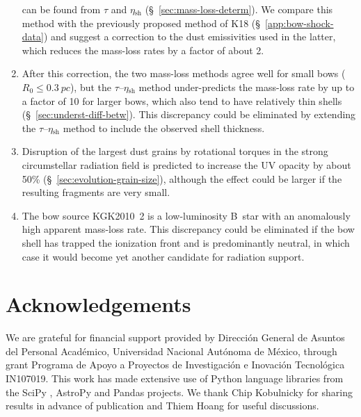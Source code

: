 \documentclass[useAMS, usenatbib, a4paper]{mnras}
\newcommand\shell{\ensuremath{_{\text{sh}}}}
\begin{document}
\begin{enumerate}[1.]
  can be found from \(\tau\) and \(\eta\shell\)
  (\S~\ref{sec:mass-loss-determ}). We compare this method with the
  previously proposed method of K18 (\S~\ref{app:bow-shock-data}) and
  suggest a correction to the dust emissivities used in the latter,
  which reduces the mass-loss rates by a factor of about 2.
\item After this correction, the two mass-loss methods agree well for
  small bows (\(R_0 \le \SI{0.3}{pc}\)), but the
  \(\tau\)--\(\eta\shell\) method under-predicts the mass-loss rate by
  up to a factor of 10 for larger bows, which also tend to have
  relatively thin shells (\S~\ref{sec:underst-diff-betw}).  This
  discrepancy could be eliminated by extending the
  \(\tau\)--\(\eta\shell\) method to include the observed shell
  thickness.
\item Disruption of the largest dust grains by rotational torques in
  the strong circumstellar radiation field is predicted to increase
  the UV opacity by about 50\% (\S~\ref{sec:evolution-grain-size}),
  although the effect could be larger if the resulting fragments are
  very small.
\item The bow source KGK2010~2 is a low-luminosity B~star with an
  anomalously high apparent mass-loss rate.  This discrepancy could be
  eliminated if the bow shell has trapped the ionization front and is
  predominantly neutral, in which case it would become yet another
  candidate for radiation support.
\end{enumerate}


\section*{Acknowledgements}
We are grateful for financial support provided by Dirección General de
Asuntos del Personal Académico, Universidad Nacional Autónoma de
México, through grant Programa de Apoyo a Proyectos de Investigación e
Inovación Tecnológica IN107019.  This work has made extensive use of
Python language libraries from the SciPy \citep{Jones:2001a}, AstroPy
\citep{Astropy-Collaboration:2013a, Astropy-Collaboration:2018a} and
Pandas \citep{McKinney:2010a} projects.  We thank Chip Kobulnicky for
sharing results in advance of publication and Thiem Hoang for useful
discussions.
\end{document}

